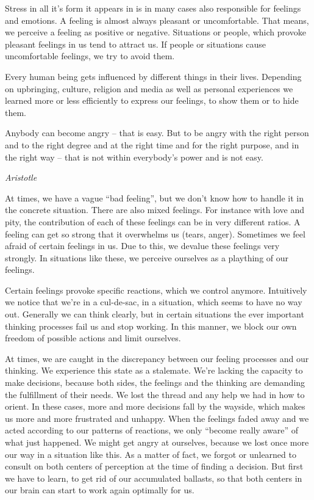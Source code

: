 \documentclass[../Book.Stress_regulation.tex]{subfiles}
\begin{document}
Stress in all it's form it appears in is in many cases also responsible for feelings and emotions.
A feeling is almost always pleasant or uncomfortable.
That means, we perceive a feeling as positive or negative.
Situations or people, which provoke pleasant feelings in us tend to attract us.
If people or situations cause uncomfortable feelings, we try to avoid them.

Every human being gets influenced by different things in their lives.
Depending on upbringing, culture, religion and media as well as personal experiences we learned more or less efficiently to express our feelings, to show them or to hide them.

\epigraph{Anybody can become angry -- that is easy. But to be angry with the right person and to the right degree and at the right time and for the right purpose, and in the right way -- that is not within everybody's power and is not easy.}{\textit{Aristotle}}


At times, we have a vague ``bad feeling'', but we don't know how to handle it in the concrete situation.
There are also mixed feelings.
For instance with love and pity, the contribution of each of these feelings can be in very different ratios.
A feeling can get so strong that it overwhelms us (tears, anger).
Sometimes we feel afraid of certain feelings in us.
Due to this, we devalue these feelings very strongly.
In situations like these, we perceive ourselves as a plaything of our feelings.

Certain feelings provoke specific reactions, which we control anymore.
Intuitively we notice that we're in a cul-de-sac, in a situation, which seems to have no way out.
Generally we can think clearly, but in certain situations the ever important thinking processes fail us and stop working.
In this manner, we block our own freedom of possible actions and limit ourselves.

At times, we are caught in the discrepancy between our feeling processes and our thinking.
We experience this state as a stalemate.
We're lacking the capacity to make decisions, because both sides, the feelings and the thinking are demanding the fulfillment of their needs.
We lost the thread and any help we had in how to orient.
In these cases, more and more decisions fall by the wayside, which makes us more and more frustrated and unhappy.
When the feelings faded away and we acted according to our patterns of reactions, we only ``become really aware'' of what just happened.
We might get angry at ourselves, because we lost once more our way in a situation like this.
As a matter of fact, we forgot or unlearned to consult on both centers of perception at the time of finding a decision.
But first we have to learn, to get rid of our accumulated ballasts, so that both centers in our brain can start to work again optimally for us.
\end{document}

